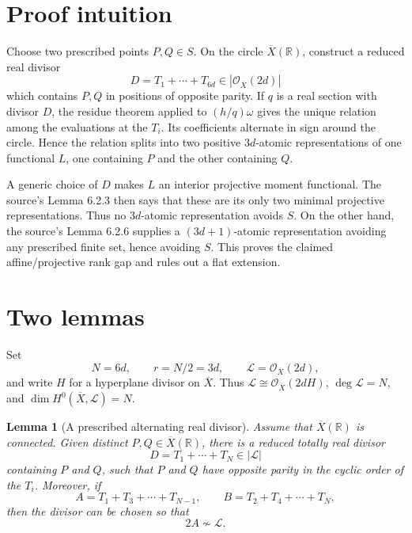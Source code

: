 \documentclass[11pt]{article}
\newtheorem{lemma}{Lemma}
\newcommand{\R}{\mathbb{R}}
\newcommand{\cL}{\mathcal{L}}
\begin{document}
\section*{Proof intuition}

Choose two prescribed points $P,Q\in S$. On the circle
$\overline X(\R)$, construct a reduced real divisor
\[
 D=T_1+\cdots+T_{6d}\in|\mathcal O_{\overline X}(2d)|
\]
which contains $P,Q$ in positions of opposite parity. If $q$ is a real
section with divisor $D$, the residue theorem applied to
$(h/q)\omega$ gives the unique relation among the evaluations at the
$T_i$. Its coefficients alternate in sign around the circle. Hence the
relation splits into two positive $3d$-atomic representations of one
functional $L$, one containing $P$ and the other containing $Q$.

A generic choice of $D$ makes $L$ an interior projective moment functional.
The source's Lemma 6.2.3 then says that these are its only two minimal
projective representations. Thus no $3d$-atomic representation avoids
$S$. On the other hand, the source's Lemma 6.2.6 supplies a
$(3d+1)$-atomic representation avoiding any prescribed finite set, hence
avoiding $S$. This proves the claimed affine/projective rank gap and rules
out a flat extension.

\section*{Two lemmas}

Set
\[
 N=6d,\qquad r=N/2=3d,\qquad
 \cL=\mathcal O_{\overline X}(2d),
\]
and write $H$ for a hyperplane divisor on $\overline X$. Thus
$\cL\cong\mathcal O_{\overline X}(2dH)$,
$\deg\cL=N$, and $\dim H^0(\overline X,\cL)=N$.

\begin{lemma}[A prescribed alternating real divisor]\label{lem:divisor}
Assume that $\overline X(\R)$ is connected. Given distinct
$P,Q\in\overline X(\R)$, there is a reduced totally real divisor
\[
 D=T_1+\cdots+T_N\in|\cL|
\]
containing $P$ and $Q$, such that $P$ and $Q$ have opposite parity in the
cyclic order of the $T_i$. Moreover, if
\[
 A=T_1+T_3+\cdots+T_{N-1},
 \qquad
 B=T_2+T_4+\cdots+T_N,
\]
then the divisor can be chosen so that
\begin{equation}\label{eq:not-torsion}
 2A\not\sim\cL .
\end{equation}
\end{lemma}
\end{document}
